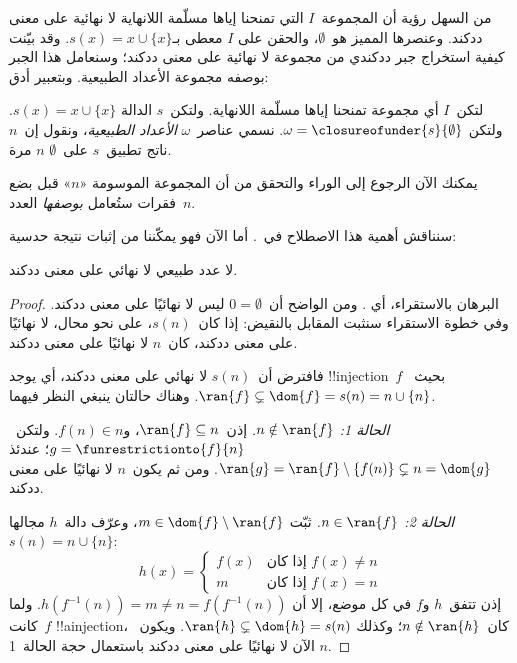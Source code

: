 \documentclass[../../../include/open-logic-section]{subfiles}
\begin{document}
من السهل رؤية أن المجموعة~$I$ التي تمنحنا إياها مسلّمة اللانهاية
لا نهائية على معنى ددكند. وعنصرها المميز هو~$\emptyset$، والحقن على
$I$ معطى بـ$s(x) = x\cup\{x\}$. وقد بيّنت
 كيفية
استخراج جبر ددكندي من مجموعة لا نهائية على معنى ددكند؛ وسنعامل هذا
الجبر بوصفه مجموعة الأعداد الطبيعية. وبتعبير أدق:
\begin{defn}
لتكن~$I$ أي مجموعة تمنحنا إياها مسلّمة اللانهاية. ولتكن~$s$ الدالة
$s(x) = x \cup \{x\}$. ولتكن
$\omega = \closureofunder{s}{\emptyset}$. نسمي عناصر~$\omega$
\emph{الأعداد الطبيعية}، ونقول إن~$n$ ناتج تطبيق~$s$ على~$\emptyset$
$n$ مرة.
\end{defn}

يمكنك الآن الرجوع إلى الوراء والتحقق من أن المجموعة الموسومة «$n$»
قبل بضع فقرات ستُعامل \emph{بوصفها} العدد~$n$.

سنناقش أهمية هذا الاصطلاح في~. أما الآن فهو
يمكّننا من إثبات نتيجة حدسية:

\begin{prop}
لا عدد طبيعي لا نهائي على معنى ددكند.
\end{prop}

\begin{proof}
البرهان بالاستقراء، أي
. ومن الواضح
أن~$0 = \emptyset$ ليس لا نهائيًا على معنى ددكند. وفي خطوة الاستقراء
سنثبت المقابل بالنقيض: إذا كان~$s(n)$، على نحو محال، لا نهائيًا على
معنى ددكند، كان~$n$ لا نهائيًا على معنى ددكند.

فافترض أن~$s(n)$ لا نهائي على معنى ددكند، أي يوجد !!{injection}~$f$
بحيث~$\ran{f}\subsetneq \dom{f} = s(n) = n \cup \{n\}$. وهناك حالتان
ينبغي النظر فيهما.

\emph{الحالة 1: $n \notin \ran{f}$.} إذن~$\ran{f} \subseteq n$،
و$f(n) \in n$. ولتكن~$g = \funrestrictionto{f}{n}$؛ عندئذ
$\ran{g} = \ran{f} \setminus \{f(n)\} \subsetneq n = \dom{g}$.
ومن ثم يكون~$n$ لا نهائيًا على معنى ددكند.

\emph{الحالة 2: $n \in \ran{f}$.} ثبّت
$m \in \dom{f} \setminus \ran{f}$، وعرّف دالة~$h$ مجالها
$s(n) = n \cup \{n\}$:
\[
h(x) = 
	\begin{cases}
		f(x) & \text{إذا كان }f(x) \neq n\\
		m & \text{إذا كان }f(x)=n
	\end{cases}
\]
إذن تتفق~$h$ و$f$ في كل موضع، إلا أن
$h(f^{-1}(n)) = m \neq n = f(f^{-1}(n))$. ولما كانت~$f$
!!a{injection}، كان~$n \notin \ran{h}$؛ وكذلك
$\ran{h} \subsetneq \dom{h} = s(n)$. ويكون~$n$ الآن لا نهائيًا
على معنى ددكند باستعمال حجة الحالة~1.
\end{proof}
\end{document}
